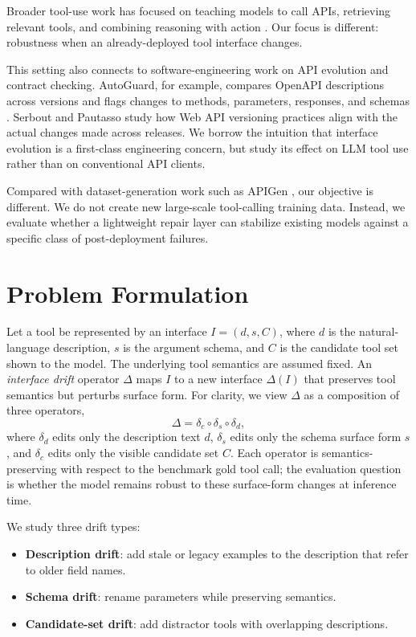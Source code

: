 \documentclass[runningheads]{llncs}
\begin{document}
Broader tool-use work has focused on teaching models to call APIs, retrieving
relevant tools, and combining reasoning with action
\cite{schick2023toolformer,patil2023gorilla,qin2023toolllm,yao2022react}. Our
focus is different: robustness when an already-deployed tool interface changes.

This setting also connects to software-engineering work on API evolution and
contract checking. AutoGuard, for example, compares OpenAPI descriptions across
versions and flags changes to methods, parameters, responses, and schemas
\cite{lercher2025autoguard}. Serbout and Pautasso
\cite{serbout2023versioning} study how Web API versioning practices align with the
actual changes made across releases. We borrow the intuition that interface evolution is a
first-class engineering concern, but study its effect on LLM tool use rather than
on conventional API clients.

Compared with dataset-generation work such as APIGen \cite{liu2024apigen}, our
objective is different. We do not create new large-scale tool-calling training data.
Instead, we evaluate whether a lightweight repair layer can stabilize existing models
against a specific class of post-deployment failures.

\section{Problem Formulation}
Let a tool be represented by an interface
$I = (d, s, C)$, where $d$ is the natural-language description, $s$ is the argument
schema, and $C$ is the candidate tool set shown to the model. The underlying tool
semantics are assumed fixed. An \emph{interface drift} operator $\Delta$ maps $I$ to
a new interface $\Delta(I)$ that preserves tool semantics but perturbs surface form.
For clarity, we view $\Delta$ as a composition of three operators,
\[
\Delta = \delta_c \circ \delta_s \circ \delta_d,
\]
where $\delta_d$ edits only the description text $d$, $\delta_s$ edits only the
schema surface form $s$, and $\delta_c$ edits only the visible candidate set $C$.
Each operator is semantics-preserving with respect to the benchmark gold tool call;
the evaluation question is whether the model remains robust to these surface-form
changes at inference time.

We study three drift types:
\begin{itemize}
\item \textbf{Description drift}: add stale or legacy examples to the description that
refer to older field names.
\item \textbf{Schema drift}: rename parameters while preserving semantics.
\item \textbf{Candidate-set drift}: add distractor tools with overlapping descriptions.
\end{itemize}
\end{document}
